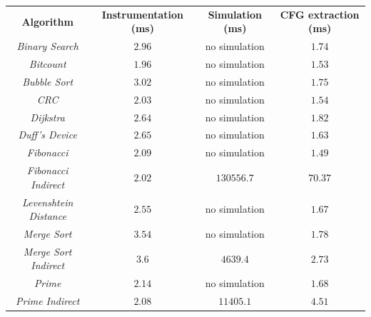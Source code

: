 \begin{table}
  \centering
  \begin{tabular}{|c|c|c|c|}
    \hline
    \textbf{Algorithm}                   & \textbf{Instrumentation (ms)} & \textbf{Simulation (ms)} & \textbf{CFG extraction (ms)} \\
    \hhline{====} \textit{Binary Search} & $2.96$                        & no simulation            & $1.74$                       \\
    \hline
    \textit{Bitcount}                    & $1.96$                        & no simulation            & $1.53$                       \\
    \hline
    \textit{Bubble Sort}                 & $3.02$                        & no simulation            & $1.75$                       \\
    \hline
    \textit{CRC}                         & $2.03$                        & no simulation            & $1.54$                       \\
    \hline
    \textit{Dijkstra}                    & $2.64$                        & no simulation            & $1.82$                       \\
    \hline
    \textit{Duff's Device}               & $2.65$                        & no simulation            & $1.63$                       \\
    \hline
    \textit{Fibonacci}                   & $2.09$                        & no simulation            & $1.49$                       \\
    \hline
    \textit{Fibonacci Indirect}          & $2.02$                        & $130556.7$               & $70.37$                      \\
    \hline
    \textit{Levenshtein Distance}        & $2.55$                        & no simulation            & $1.67$                       \\
    \hline
    \textit{Merge Sort}                  & $3.54$                        & no simulation            & $1.78$                       \\
    \hline
    \textit{Merge Sort Indirect}         & $3.6$                         & $4639.4$                 & $2.73$                       \\
    \hline
    \textit{Prime}                       & $2.14$                        & no simulation            & $1.68$                       \\
    \hline
    \textit{Prime Indirect}              & $2.08$                        & $11405.1$                & $4.51$                       \\

\end{tabular}
\end{table}
